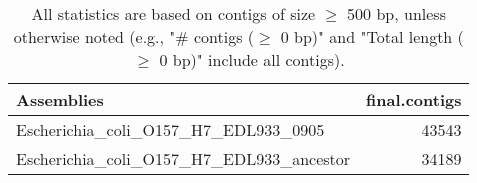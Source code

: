 \documentclass[12pt,a4paper]{article}
\begin{document}
\begin{table}[ht]
\begin{center}
\caption{All statistics are based on contigs of size $\geq$ 500 bp, unless otherwise noted (e.g., "\# contigs ($\geq$ 0 bp)" and "Total length ($\geq$ 0 bp)" include all contigs).}
\begin{tabular}{|l*{1}{|r}|}
\hline
Assemblies & final.contigs \\ \hline
Escherichia\_coli\_O157\_H7\_EDL933\_0905 & 43543 \\ \hline
Escherichia\_coli\_O157\_H7\_EDL933\_ancestor & 34189 \\ \hline
\end{tabular}
\end{center}
\end{table}
\end{document}
